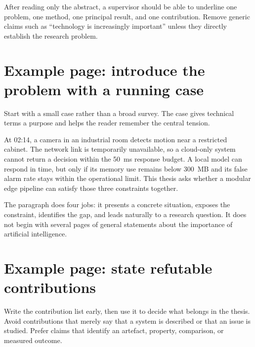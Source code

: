 \begin{keypoint}
After reading only the abstract, a supervisor should be able to underline one
problem, one method, one principal result, and one contribution. Remove generic
claims such as ``technology is increasingly important'' unless they directly
establish the research problem.
\end{keypoint}

\section{Example page: introduce the problem with a running case}
Start with a small case rather than a broad survey. The case gives technical
terms a purpose and helps the reader remember the central tension.

\begin{resultbox}
At 02:14, a camera in an industrial room detects motion near a restricted
cabinet. The network link is temporarily unavailable, so a cloud-only system
cannot return a decision within the 50~ms response budget. A local model can
respond in time, but only if its memory use remains below 300~MB and its false
alarm rate stays within the operational limit. This thesis asks whether a
modular edge pipeline can satisfy those three constraints together.
\end{resultbox}

The paragraph does four jobs: it presents a concrete situation, exposes the
constraint, identifies the gap, and leads naturally to a research question. It
does not begin with several pages of general statements about the importance of
artificial intelligence.

\section{Example page: state refutable contributions}
Write the contribution list early, then use it to decide what belongs in the
thesis. Avoid contributions that merely say that a system is described or that
an issue is studied. Prefer claims that identify an artefact, property,
comparison, or measured outcome.

